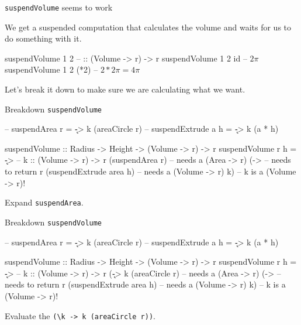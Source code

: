 \documentclass[ignorenonframetext,]{beamer}
\begin{document}
\begin{frame}[fragile]{\texttt{suspendVolume} seems to work}

We get a suspended computation that calculates the volume and waits for
us to do something with it.

\begin{haskellcode}
suspendVolume 1 2      -- :: (Volume -> r) -> r
suspendVolume 1 2 id   -- $2 \pi$
suspendVolume 1 2 (*2) -- $2 * 2\pi = 4 \pi$
\end{haskellcode}

Let's break it down to make sure we are calculating what we want.

\end{frame}

\begin{frame}[fragile]{Breakdown \texttt{suspendVolume}}

\begin{haskellcode}
-- suspendArea r = \k -> k (areaCircle r)
-- suspendExtrude a h = \k -> k (a * h)
\end{haskellcode}

\begin{haskellcode}
suspendVolume :: Radius -> Height -> (Volume -> r) -> r
suspendVolume r h = \k ->      -- k :: (Volume -> r) -> r
  (suspendArea r)              -- needs a (Area -> r)
  (\area ->                    -- needs to return r
    (suspendExtrude area h)    -- needs a (Volume -> r)
      k)                       -- k is a (Volume -> r)!
\end{haskellcode}

Expand \texttt{suspendArea}.

\end{frame}

\begin{frame}[fragile]{Breakdown \texttt{suspendVolume}}

\begin{haskellcode}
-- suspendArea r = \k -> k (areaCircle r)
-- suspendExtrude a h = \k -> k (a * h)
\end{haskellcode}

\begin{haskellcode}
suspendVolume :: Radius -> Height -> (Volume -> r) -> r
suspendVolume r h = \k ->      -- k :: (Volume -> r) -> r
  (\k -> k (areaCircle r)      -- needs a (Area -> r)
  (\area ->                    -- needs to return r
    (suspendExtrude area h)    -- needs a (Volume -> r)
      k)                       -- k is a (Volume -> r)!
\end{haskellcode}

Evaluate the
\texttt{(\textbackslash{}k -\textgreater{} k (areaCircle r))}.

\end{frame}
\end{document}
